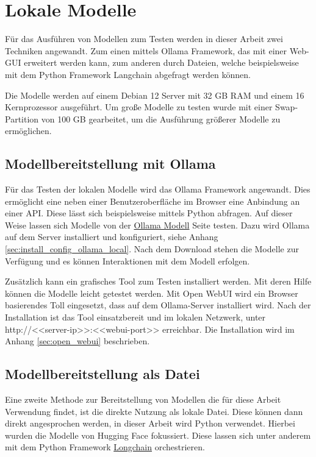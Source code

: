 \section{Lokale Modelle}
Für das Ausführen von Modellen zum Testen werden in dieser Arbeit zwei Techniken angewandt. Zum einen mittels Ollama Framework, das mit einer Web-GUI erweitert werden kann, zum anderen durch Dateien, welche beispielsweise mit dem Python Framework Langchain abgefragt werden können.\vspace{0.2cm}

Die Modelle werden auf einem Debian 12 Server mit 32 GB RAM und einem 16 Kernprozessor ausgeführt. Um große Modelle zu testen wurde mit einer Swap-Partition von 100 GB gearbeitet, um die Ausführung größerer Modelle zu ermöglichen.\vspace{0.2cm}

\subsection{Modellbereitstellung mit Ollama}
Für das Testen der lokalen Modelle wird das Ollama Framework angewandt. Dies ermöglicht eine neben einer Benutzeroberfläche im Browser eine Anbindung an einer API. Diese lässt sich beispielsweise mittels Python abfragen. Auf dieser Weise lassen sich Modelle von der \href{https://ollama.com/search}{Ollama Modell} Seite testen. Dazu wird Ollama auf dem Server installiert und konfiguriert, siehe Anhang \ref{sec:install_config_ollama_local}. Nach dem Download stehen die Modelle zur Verfügung und es können Interaktionen mit dem Modell erfolgen.\vspace{0.2cm}

Zusätzlich kann ein grafisches Tool zum Testen installiert werden. Mit deren Hilfe können die Modelle leicht getestet werden. Mit Open WebUI wird ein Browser basierendes Toll eingesetzt, dass auf dem Ollama-Server installiert wird. Nach der Installation ist das Tool einsatzbereit und im lokalen Netzwerk, unter http://<<server-ip>>:<<webui-port>> erreichbar. Die Installation wird im Anhang \ref{sec:open_webui} beschrieben.



\subsection{Modellbereitstellung als Datei}
Eine zweite Methode zur Bereitstellung von Modellen die für diese Arbeit Verwendung findet, ist die direkte Nutzung als lokale Datei. Diese können dann direkt angesprochen werden, in dieser Arbeit wird Python verwendet. Hierbei wurden die Modelle von Hugging Face fokussiert. Diese lassen sich unter anderem mit dem Python Framework \href{https://pypi.org/project/langchain/}{Longchain} orchestrieren.\vspace{0.2cm}

